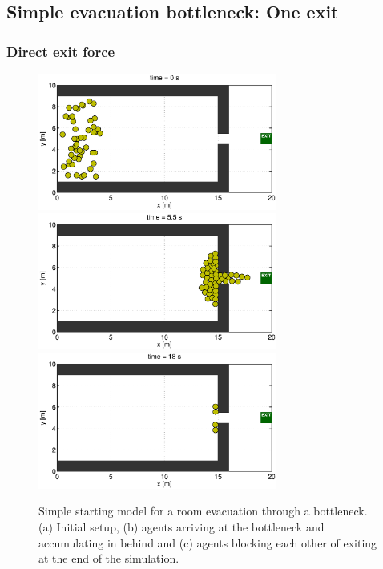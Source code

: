 \documentclass[11pt]{article}
\begin{document}
\subsection{Simple evacuation bottleneck: One exit}

\subsubsection{Direct exit force}

\begin{figure}
	\begin{center}
	\includegraphics[width=0.7\textwidth]
	{figures/Model1_direct_1b_000000.eps}
	\qquad
	\includegraphics[width=0.7\textwidth]
	{figures/Model1_direct_1b_000550.eps}
	\qquad
	\includegraphics[width=0.7\textwidth]
	{figures/Model1_direct_1b_001800.eps}
	\caption{Simple starting model for a room evacuation through a bottleneck. (a) Initial setup, (b) agents arriving at the bottleneck and accumulating in behind and (c) agents blocking each other of exiting at the end of the simulation.}
	\label{fig:simple1}
	\end{center}
\end{figure}
\end{document}
